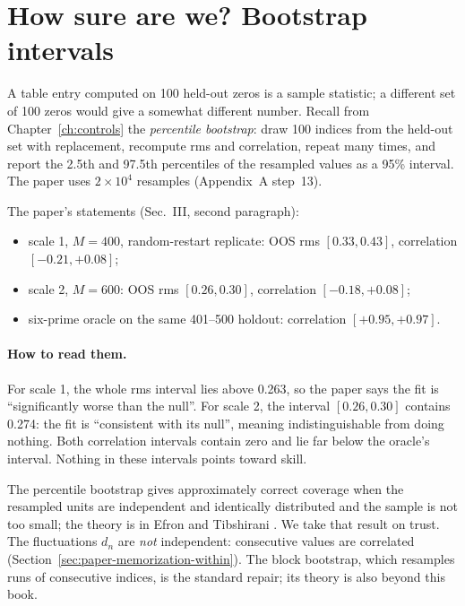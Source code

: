 \section{How sure are we? Bootstrap intervals}\label{sec:paper-memorization-bootstrap}

A table entry computed on 100 held-out zeros is a sample statistic; a different set of 100 zeros would give a somewhat different number. Recall from Chapter~\ref{ch:controls} the \emph{percentile bootstrap}: draw 100 indices from the held-out set with replacement, recompute rms and correlation, repeat many times, and report the 2.5th and 97.5th percentiles of the resampled values as a 95\% interval. The paper uses $2\times10^4$ resamples (Appendix~A step~13).

The paper's statements (Sec.~III, second paragraph):
\begin{itemize}
\item scale 1, $M=400$, random-restart replicate: OOS rms $[0.33,0.43]$, correlation $[-0.21,+0.08]$;
\item scale 2, $M=600$: OOS rms $[0.26,0.30]$, correlation $[-0.18,+0.08]$;
\item six-prime oracle on the same 401--500 holdout: correlation $[+0.95,+0.97]$.
\end{itemize}

\paragraph{How to read them.} For scale 1, the whole rms interval lies above 0.263, so the paper says the fit is ``significantly worse than the null''. For scale 2, the interval $[0.26,0.30]$ contains 0.274: the fit is ``consistent with its null'', meaning indistinguishable from doing nothing. Both correlation intervals contain zero and lie far below the oracle's interval. Nothing in these intervals points toward skill.

\begin{beyond}
The percentile bootstrap gives approximately correct coverage when the resampled units are independent and identically distributed and the sample is not too small; the theory is in Efron and Tibshirani \cite{efron}. We take that result on trust. The fluctuations $d_n$ are \emph{not} independent: consecutive values are correlated (Section~\ref{sec:paper-memorization-within}). The block bootstrap, which resamples runs of consecutive indices, is the standard repair; its theory is also beyond this book.
\end{beyond}

